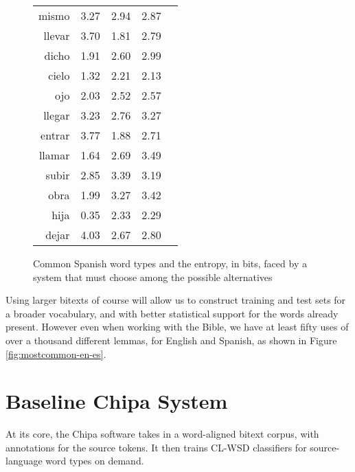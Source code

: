 \begin{figure*}
\begin{tiny}
\begin{centering}
\begin{tabular}{|r|c|c|c|c|}
mismo  &     3.27         &      2.94        &       2.87       \\
llevar &     3.70         &      1.81        &       2.79       \\
dicho  &     1.91         &      2.60        &       2.99       \\
cielo  &     1.32         &      2.21        &       2.13       \\
ojo    &     2.03         &      2.52        &       2.57       \\
llegar &     3.23         &      2.76        &       3.27       \\
entrar &     3.77         &      1.88        &       2.71       \\
llamar &     1.64         &      2.69        &       3.49       \\
subir  &     2.85         &      3.39        &       3.19       \\
obra   &     1.99         &      3.27        &       3.42       \\
hija   &     0.35         &      2.33        &       2.29       \\
dejar  &     4.03         &      2.67        &       2.80       \\
    \hline
  \end{tabular}
  \end{centering}
  \end{tiny}
  \caption{Common Spanish word types and the entropy, in bits, faced by a
  system that must choose among the possible alternatives} 
  \label{fig:mostcommon-es-entropy}
\end{figure*}

Using larger bitexts of course will allow us to construct training and test
sets for a broader vocabulary, and with better statistical support for the
words already present. However even when working with the Bible, we
have at least fifty uses of over a thousand different lemmas, for English and
Spanish, as shown in Figure \ref{fig:mostcommon-en-es}.


\section{Baseline Chipa System}
At its core, the Chipa software takes in a word-aligned bitext corpus, with
annotations for the source tokens. It then trains CL-WSD classifiers for
source-language word types on demand. 

